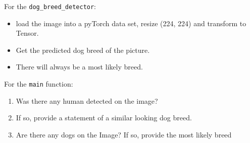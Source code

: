 \documentclass[paper=A4, DIV=10, parskip=half]{scrartcl}
\begin{document}
For the \texttt{dog\_breed\_detector}:

\begin{itemize}
  \item load the image into a pyTorch data set, resize (224, 224) and transform to Tensor.
  \item Get the predicted dog breed of the picture.
  \item There will always be a most likely breed. 
\end{itemize}

For the \texttt{main} function:

\begin{enumerate}
  \item Was there any human detected on the image?
  \item If so, provide a statement of a similar looking dog breed.
  \item Are there any dogs on the Image? If so,  provide the most likely breed
\end{enumerate}



\end{document}
